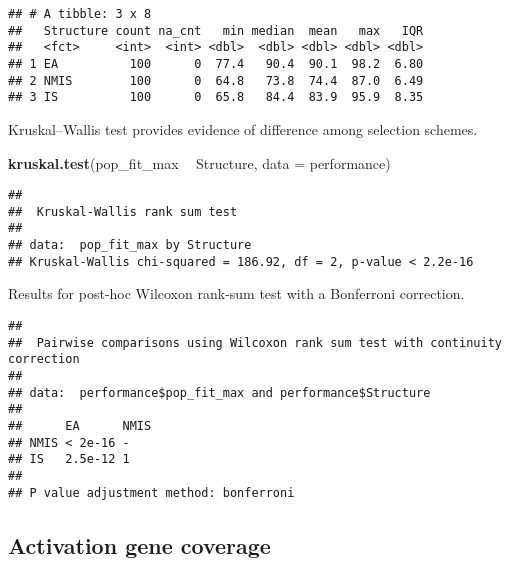 \documentclass[]{book}
\newenvironment{Shaded}{\begin{snugshade}}{\end{snugshade}}
\newcommand{\DataTypeTok}[1]{\textcolor[rgb]{0.13,0.29,0.53}{#1}}
\newcommand{\KeywordTok}[1]{\textcolor[rgb]{0.13,0.29,0.53}{\textbf{#1}}}
\newcommand{\NormalTok}[1]{#1}
\newcommand{\OperatorTok}[1]{\textcolor[rgb]{0.81,0.36,0.00}{\textbf{#1}}}
\newcommand{\OtherTok}[1]{\textcolor[rgb]{0.56,0.35,0.01}{#1}}
\newcommand{\StringTok}[1]{\textcolor[rgb]{0.31,0.60,0.02}{#1}}
\begin{document}
\begin{verbatim}
## # A tibble: 3 x 8
##   Structure count na_cnt   min median  mean   max   IQR
##   <fct>     <int>  <int> <dbl>  <dbl> <dbl> <dbl> <dbl>
## 1 EA          100      0  77.4   90.4  90.1  98.2  6.80
## 2 NMIS        100      0  64.8   73.8  74.4  87.0  6.49
## 3 IS          100      0  65.8   84.4  83.9  95.9  8.35
\end{verbatim}

Kruskal--Wallis test provides evidence of difference among selection schemes.

\begin{Shaded}
\begin{Highlighting}[]
\KeywordTok{kruskal.test}\NormalTok{(pop_fit_max }\OperatorTok{~}\StringTok{ }\NormalTok{Structure, }\DataTypeTok{data =}\NormalTok{ performance)}
\end{Highlighting}
\end{Shaded}

\begin{verbatim}
## 
##  Kruskal-Wallis rank sum test
## 
## data:  pop_fit_max by Structure
## Kruskal-Wallis chi-squared = 186.92, df = 2, p-value < 2.2e-16
\end{verbatim}

Results for post-hoc Wilcoxon rank-sum test with a Bonferroni correction.

\begin{Shaded}
\end{Shaded}

\begin{verbatim}
## 
##  Pairwise comparisons using Wilcoxon rank sum test with continuity correction 
## 
## data:  performance$pop_fit_max and performance$Structure 
## 
##      EA      NMIS
## NMIS < 2e-16 -   
## IS   2.5e-12 1   
## 
## P value adjustment method: bonferroni
\end{verbatim}

\hypertarget{activation-gene-coverage-11}{%
\subsection{Activation gene coverage}\label{activation-gene-coverage-11}}
\end{document}
